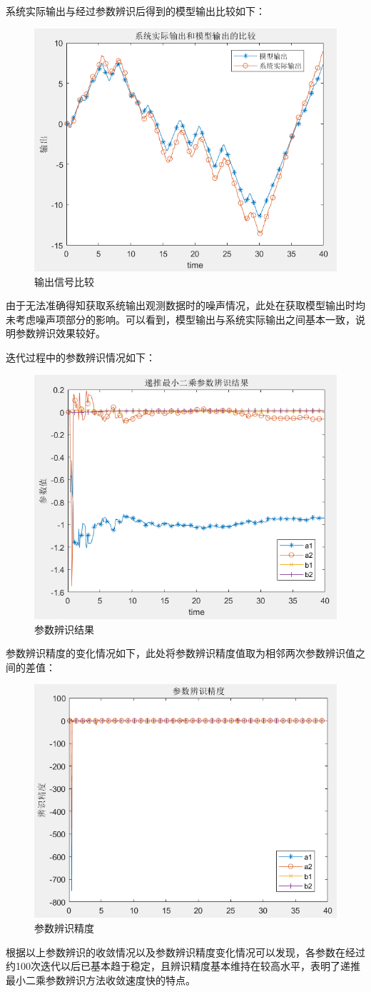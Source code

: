 \documentclass[UTF8, twocolumn]{article}
\begin{document}
系统实际输出与经过参数辨识后得到的模型输出比较如下：
\begin{figure}[H]
    \centering %
    \includegraphics[width=.4\textwidth]{figure/最小二乘-电机转角-输出比较.png} 
    \caption{输出信号比较} %
\end{figure}
由于无法准确得知获取系统输出观测数据时的噪声情况，此处在获取模型输出时均未考虑噪声项部分的影响。可以看到，模型输出与系统实际输出之间基本一致，说明参数辨识效果较好。

迭代过程中的参数辨识情况如下：
\begin{figure}[H]
    \centering %
    \includegraphics[width=.4\textwidth]{figure/最小二乘-电机转角-参数辨识结果.png} 
    \caption{参数辨识结果} %
\end{figure}

参数辨识精度的变化情况如下，此处将参数辨识精度值取为相邻两次参数辨识值之间的差值：
\begin{figure}[H]
    \centering %
    \includegraphics[width=.4\textwidth]{figure/最小二乘-电机转角-参数辨识精度.png} 
    \caption{参数辨识精度} %
\end{figure}
根据以上参数辨识的收敛情况以及参数辨识精度变化情况可以发现，各参数在经过约100次迭代以后已基本趋于稳定，且辨识精度基本维持在较高水平，表明了递推最小二乘参数辨识方法收敛速度快的特点。
\end{document}
